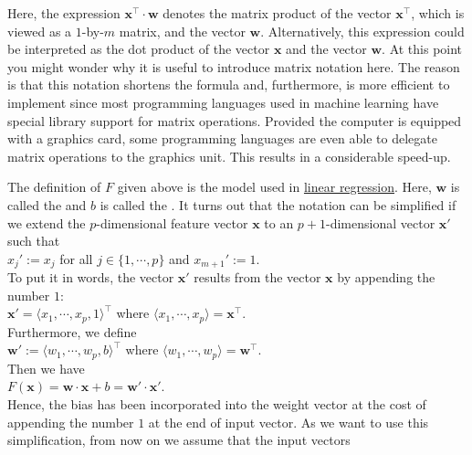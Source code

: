 Here, the expression $\mathbf{x}^\top \cdot \mathbf{w}$ denotes the matrix product of the vector
$\mathbf{x}^\top$, which is viewed as a $1$-by-$m$ matrix, and the vector $\mathbf{w}$.  Alternatively, this
expression could be interpreted as the dot product of the vector $\mathbf{x}$ and the vector $\mathbf{w}$.
At this point you might wonder why it is useful to introduce matrix notation here.  The reason is
that this notation shortens the formula and, furthermore, is more efficient to implement since most
programming languages used in machine learning have special library support for matrix operations.  
Provided the computer is equipped with a graphics card,  some
programming languages are even able to delegate matrix operations to the graphics unit.  This results in a
considerable speed-up.

The definition of $F$ given above is the model used in
\href{https://en.wikipedia.org/wiki/Linear_regression}{linear regression}. 
Here, $\mathbf{w}$ is called the  and $b$ is called the .  It turns
out that the notation can be simplified if we extend the $p$-dimensional feature vector $\mathbf{x}$ to an
$p+1$-dimensional vector $\mathbf{x}'$ such that
\\[0.2cm]
\hspace*{1.3cm}
$x_j' := x_j$ \quad for all $j\in\{1,\cdots,p\}$ \quad and \quad $x_{m+1}' := 1$.
\\[0.2cm]
To put it in words, the vector $\mathbf{x}'$ results from the vector $\mathbf{x}$ by appending the number $1$:
\\[0.2cm]
\hspace*{1.3cm}
$\mathbf{x}' = \langle x_1, \cdots, x_p, 1 \rangle^\top$ \quad where $\langle x_1, \cdots, x_p \rangle = \mathbf{x}^\top$.
\\[0.2cm]
Furthermore, we define 
\\[0.2cm]
\hspace*{1.3cm}
$\mathbf{w}' := \langle w_1, \cdots, w_p, b \rangle^\top$ \quad where $\langle w_1, \cdots, w_p \rangle = \mathbf{w}^\top$.
\\[0.2cm]
Then we have
\\[0.2cm]
\hspace*{1.3cm}
$F(\mathbf{x}) = \mathbf{w} \cdot \mathbf{x} + b = \mathbf{w}' \cdot \mathbf{x}'$.
\\[0.2cm]
Hence, the bias has been incorporated into the weight vector at the cost of appending the number $1$ at the end of
input vector.  As we want to use this simplification, from now on we assume that the input vectors
